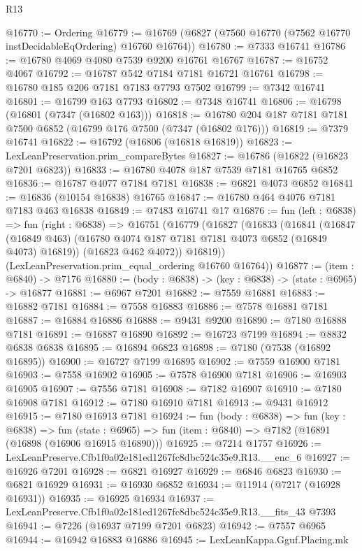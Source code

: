 \begin{lexlean}{R13}
\begin{coremodule}
@16770 := Ordering
@16779 := @16769 (@6827 (@7560 @16770 (@7562 @16770 instDecidableEqOrdering) @16760 @16764))
@16780 := @7333 @16741
@16786 := @16780 @4069 @4080 @7539 @9200 @16761 @16767
@16787 := @16752 @4067
@16792 := @16787 @542 @7184 @7181 @16721 @16761
@16798 := @16780 @185 @206 @7181 @7183 @7793 @7502
@16799 := @7342 @16741
@16801 := @16799 @163 @7793
@16802 := @7348 @16741
@16806 := @16798 (@16801 (@7347 (@16802 @163)))
@16818 := @16780 @204 @187 @7181 @7181 @7500 @6852 (@16799 @176 @7500 (@7347 (@16802 @176)))
@16819 := @7379 @16741
@16822 := @16792 (@16806 (@16818 @16819))
@16823 := LexLeanPreservation.prim_compareBytes
@16827 := @16786 (@16822 (@16823 @7201 @6823))
@16833 := @16780 @4078 @187 @7539 @7181 @16765 @6852
@16836 := @16787 @4077 @7184 @7181
@16838 := @6821 @4073 @6852
@16841 := @16836 (@10154 @16838) @16765
@16847 := @16780 @464 @4076 @7181 @7183 @463 @16838
@16849 := @7483 @16741 @17
@16876 := fun (left : @6838) =>
  fun (right : @6838) =>
  @16751
    (@16779
      (@16827
        (@16833
          (@16841
            (@16847 (@16849 @463) (@16780 @4074 @187 @7181 @7181 @4073 @6852 (@16849 @4073) @16819))
            (@16823 @462 @4072))
          @16819))
      (LexLeanPreservation.prim_equal_ordering @16760 @16764))
@16877 := (item : @6840) -> @7176
@16880 := (body : @6838) -> (key : @6838) -> (state : @6965) -> @16877
@16881 := @6967 @7201
@16882 := @7559 @16881
@16883 := @16882 @7181
@16884 := @7558 @16883
@16886 := @7578 @16881 @7181
@16887 := @16884 @16886
@16888 := @9431 @9200
@16890 := @7180 @16888 @7181
@16891 := @16887 @16890
@16892 := @16723 @7199
@16894 := @8832 @6838 @6838
@16895 := @16894 @6823
@16898 := @7180 (@7538 (@16892 @16895))
@16900 := @16727 @7199 @16895
@16902 := @7559 @16900 @7181
@16903 := @7558 @16902
@16905 := @7578 @16900 @7181
@16906 := @16903 @16905
@16907 := @7556 @7181
@16908 := @7182 @16907
@16910 := @7180 @16908 @7181
@16912 := @7180 @16910 @7181
@16913 := @9431 @16912
@16915 := @7180 @16913 @7181
@16924 := fun (body : @6838) =>
  fun (key : @6838) =>
  fun (state : @6965) => fun (item : @6840) => @7182 (@16891 (@16898 (@16906 @16915 @16890)))
@16925 := @7214 @1757
@16926 := LexLeanPreserve.Cfb1f0a02e181ed1267fc8dbc524c35e9.R13.__enc_6
@16927 := @16926 @7201
@16928 := @6821 @16927
@16929 := @6846 @6823
@16930 := @6821 @16929
@16931 := @16930 @6852
@16934 := @11914 (@7217 (@16928 @16931))
@16935 := @16925 @16934
@16937 := LexLeanPreserve.Cfb1f0a02e181ed1267fc8dbc524c35e9.R13.__fits_43 @7393
@16941 := @7226 (@16937 @7199 @7201 @6823)
@16942 := @7557 @6965
@16944 := @16942 @16883 @16886
@16945 := LexLeanKappa.Gguf.Placing.mk

\end{coremodule}
\end{lexlean}
